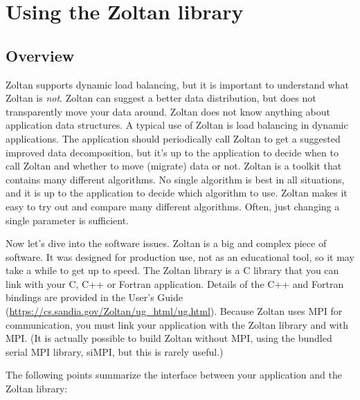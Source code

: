 %
% 
\chapter{Using the Zoltan library}
\label{cha:using}


\section{Overview}

Zoltan supports dynamic load balancing, but it is important 
to understand what Zoltan is \emph{not}. Zoltan can suggest
a better data distribution, but does not transparently move
your data around. Zoltan does not know anything about application
data structures. A typical use of Zoltan is 
load balancing in dynamic applications. The application
should periodically call Zoltan to get a suggested improved
data decomposition, but it's up to the application to
decide when to call Zoltan and whether to move (migrate) data or not.
Zoltan is a toolkit that contains many different algorithms.
No single algorithm is best in all situations, and it is
up to the application to decide which algorithm to use.
Zoltan makes it easy to try out and compare many different
algorithms. Often, just changing a single parameter is sufficient.

Now let's dive into the software issues. Zoltan is a big and complex 
piece of software. It was designed for production use, not as an educational 
tool, so it may take a while to get up to speed.
The Zoltan library is a C library that you can link with your C,
C++ or Fortran application.  Details of the C++ and Fortran bindings
are provided in the User's Guide 
(\url{https://cs.sandia.gov/Zoltan/ug_html/ug.html}).
Because Zoltan uses MPI for communication, you must link your application
with the Zoltan library and with MPI. (It is actually possible to build
Zoltan without MPI, using the bundled serial MPI library, siMPI,
but this is rarely useful.)

The following points summarize the interface between your
application and the Zoltan library:

